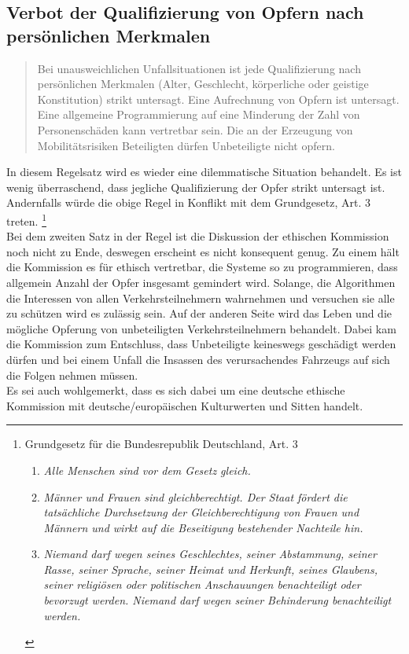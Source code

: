 \documentclass[twoside,a4paper,12pt]{article}
\begin{document}
\subsection{Verbot der Qualifizierung von Opfern nach persönlichen Merkmalen} \label{VerbotDerQualifizierungMoeglicherOpferNachPersönlichenMerkmalen}
\begin{quote}
\glqq
Bei unausweichlichen Unfallsituationen ist jede Qualifizierung nach persönlichen Merkmalen (Alter, Geschlecht, 
körperliche oder geistige Konstitution) strikt untersagt. Eine
Aufrechnung von Opfern ist untersagt. Eine allgemeine Programmierung auf eine Minderung der Zahl von Personenschäden 
kann vertretbar sein. Die an der Erzeugung von
Mobilitätsrisiken Beteiligten dürfen Unbeteiligte nicht opfern.\grqq\mbox{~\cite[S. 11]{ek}}
\end{quote}
In diesem Regelsatz wird es wieder eine dilemmatische Situation behandelt. Es ist wenig überraschend, dass jegliche Qualifizierung der Opfer strikt untersagt ist. Andernfalls würde die obige Regel in Konflikt mit dem Grundgesetz, Art. 3 treten.
\footnote{Grundgesetz für die Bundesrepublik Deutschland, Art. 3
\begin{enumerate} 
\item \textit{Alle Menschen sind vor dem Gesetz gleich.}
\item \textit{Männer und Frauen sind gleichberechtigt. Der Staat fördert die tatsächliche Durchsetzung der Gleichberechtigung von Frauen und Männern und wirkt auf die Beseitigung bestehender Nachteile hin.}
\item\textit{ Niemand darf wegen seines Geschlechtes, seiner Abstammung, seiner Rasse, seiner Sprache, seiner Heimat und Herkunft, seines Glaubens, seiner religiösen oder politischen Anschauungen benachteiligt oder bevorzugt werden. Niemand darf wegen seiner Behinderung benachteiligt werden.}
\end{enumerate}}
\\
Bei dem zweiten Satz in der Regel ist die Diskussion der ethischen Kommission noch nicht zu Ende, deswegen erscheint es nicht konsequent genug. Zu einem hält die Kommission es für ethisch vertretbar, die Systeme so zu programmieren, dass allgemein Anzahl der Opfer insgesamt gemindert wird. Solange, die Algorithmen die Interessen von allen Verkehrsteilnehmern wahrnehmen und versuchen sie alle zu schützen wird es zulässig sein. Auf der anderen Seite wird das Leben und die mögliche Opferung von unbeteiligten Verkehrsteilnehmern behandelt. Dabei kam die Kommission zum Entschluss, dass Unbeteiligte keineswegs geschädigt werden dürfen und bei einem Unfall die Insassen des verursachendes Fahrzeugs auf sich die Folgen nehmen müssen.
\\
Es sei auch wohlgemerkt, dass es sich dabei um eine deutsche ethische Kommission mit deutsche/europäischen Kulturwerten und Sitten handelt. 
\end{document}
